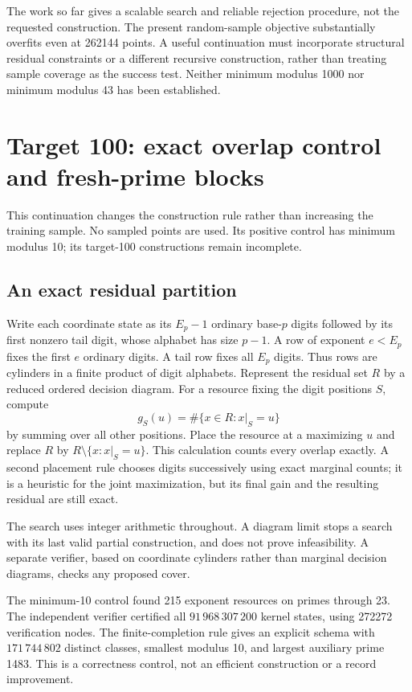 \documentclass[11pt]{article}
\begin{document}
The work so far gives a scalable search and reliable rejection procedure,
not the requested construction. The present random-sample objective
substantially overfits even at 262144 points. A useful continuation must
incorporate structural residual constraints or a different recursive
construction, rather than treating sample coverage as the success test.
Neither minimum modulus 1000 nor minimum modulus 43 has been established.

\section{Target 100: exact overlap control and fresh-prime blocks}
\label{sec:structural100}

This continuation changes the construction rule rather than increasing
the training sample. No sampled points are used. Its positive control has
minimum modulus 10; its target-100 constructions remain incomplete.

\subsection{An exact residual partition}
Write each coordinate state as its $E_p-1$ ordinary base-$p$ digits followed
by its first nonzero tail digit, whose alphabet has size $p-1$. A row of
exponent $e<E_p$ fixes the first $e$ ordinary digits. A tail row fixes all
$E_p$ digits. Thus rows are cylinders in a finite product of digit alphabets.
Represent the residual set $R$ by a reduced ordered decision diagram.
For a resource fixing the digit positions $S$, compute
\[
 g_S(u)=\#\{x\in R:x|_S=u\}
\]
by summing over all other positions. Place the resource at a maximizing
$u$ and replace $R$ by $R\setminus\{x:x|_S=u\}$. This calculation counts
every overlap exactly. A second placement rule chooses digits successively
using exact marginal counts; it is a heuristic for the joint maximization,
but its final gain and the resulting residual are still exact.

The search uses integer arithmetic throughout. A diagram limit stops a
search with its last valid partial construction, and does not prove
infeasibility. A separate verifier, based on coordinate cylinders rather
than marginal decision diagrams, checks any proposed cover.

The minimum-10 control found 215 exponent resources on primes through 23.
The independent verifier certified all $91\,968\,307\,200$ kernel states,
using 272272 verification nodes. The finite-completion rule gives an
explicit schema with $171\,744\,802$ distinct classes, smallest modulus 10,
and largest auxiliary prime 1483. This is a correctness control, not an
efficient construction or a record improvement.
\end{document}
